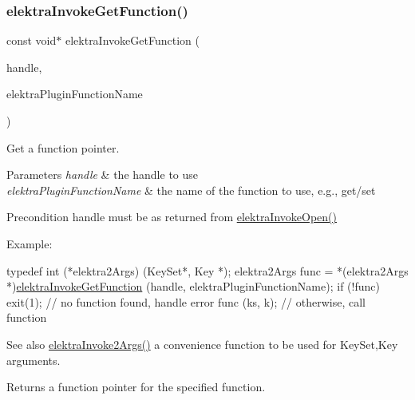 \subsubsection{\texorpdfstring{elektra\+Invoke\+Get\+Function()}{elektraInvokeGetFunction()}}
{\footnotesize\ttfamily const void$\ast$ elektra\+Invoke\+Get\+Function (\begin{DoxyParamCaption}\item[{Elektra\+Invoke\+Handle $\ast$}]{handle,  }\item[{const char $\ast$}]{elektra\+Plugin\+Function\+Name }\end{DoxyParamCaption})}



Get a function pointer. 


\begin{DoxyParams}{Parameters}
{\em handle} & the handle to use \\
\hline
{\em elektra\+Plugin\+Function\+Name} & the name of the function to use, e.\+g., get/set\\
\hline
\end{DoxyParams}
\begin{DoxyPrecond}{Precondition}
handle must be as returned from \hyperlink{group__invoke_ga3eb20131e9a8fc9a6cebf126927c09bc}{elektra\+Invoke\+Open()}
\end{DoxyPrecond}
Example\+:


\begin{DoxyCode}
\textcolor{keyword}{typedef} int (*elektra2Args) (KeySet*, Key *);
elektra2Args func = *(elektra2Args *)\hyperlink{group__invoke_ga4531a643a71a63c19c94d87bd8d0b40f}{elektraInvokeGetFunction} (handle, 
      elektraPluginFunctionName);
\textcolor{keywordflow}{if} (!func) exit(1);   \textcolor{comment}{// no function found, handle error}
func (ks, k);         \textcolor{comment}{// otherwise, call function}
\end{DoxyCode}


\begin{DoxySeeAlso}{See also}
\hyperlink{group__invoke_gaa257d93399c60f73c611205bbfa7c9a0}{elektra\+Invoke2\+Args()} a convenience function to be used for Key\+Set,Key arguments.
\end{DoxySeeAlso}
\begin{DoxyReturn}{Returns}
a function pointer for the specified function. 
\end{DoxyReturn}
\mbox{\label{group__invoke_gaf3564011b52e96c9754a7b9bc41ea478}} 
